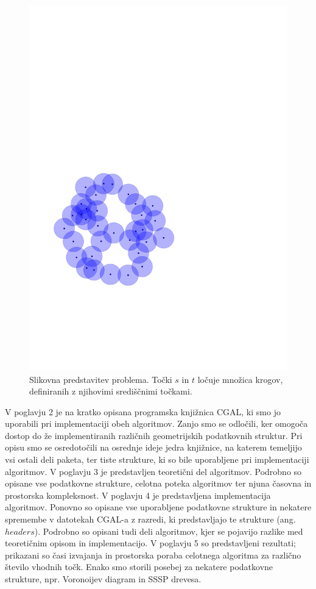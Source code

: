 \documentclass[a4paper, 12pt]{book}
\begin{document}
\begin{figure}
\centerline{\includegraphics[scale=0.6,page=4]{pics/unitdisks.pdf}}
\caption{Slikovna predstavitev problema. Točki $s$ in $t$ ločuje množica krogov, definiranih z njihovimi središčnimi točkami.}
\label{separation}
\end{figure}

V poglavju 2 je na kratko opisana programska knjižnica CGAL, ki smo jo uporabili pri implementaciji obeh algoritmov. Zanjo smo se odločili, ker omogoča dostop do že implementiranih različnih geometrijskih podatkovnih struktur. Pri opisu smo se osredotočili na osrednje ideje jedra knjižnice, na katerem temeljijo vsi ostali deli paketa, ter tiste strukture, ki so bile uporabljene pri implementaciji algoritmov. V poglavju 3 je predstavljen teoretični del algoritmov. Podrobno so opisane vse podatkovne strukture, celotna poteka algoritmov ter njuna časovna in prostorska kompleksnost. V poglavju 4 je predstavljena implementacija algoritmov. Ponovno so opisane vse uporabljene podatkovne strukture in nekatere spremembe v datotekah CGAL-a z razredi, ki predstavljajo te strukture (ang. $headers$). Podrobno so opisani tudi deli algoritmov, kjer se pojavijo razlike med teoretičnim opisom in implementacijo. V poglavju 5 so predstavljeni rezultati; prikazani so časi izvajanja in prostorska poraba celotnega algoritma za različno število vhodnih točk. Enako smo storili posebej za nekatere podatkovne strukture, npr. Voronoijev diagram in SSSP drevesa.
\end{document}
